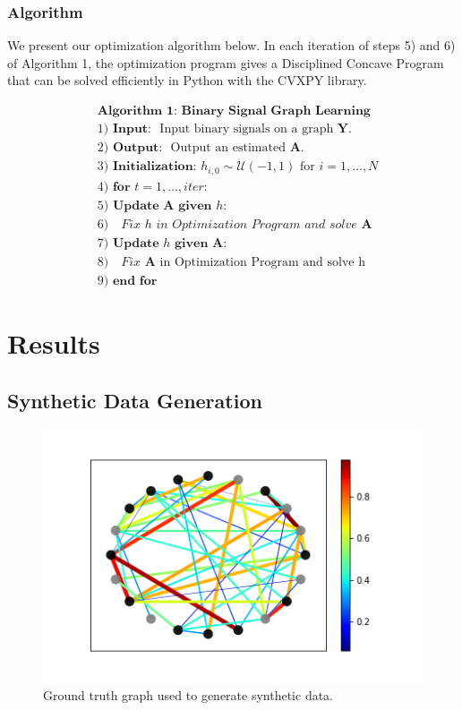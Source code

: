\documentclass[journal]{IEEEtran}
\theoremstyle{definition}
\theoremstyle{remark}
\begin{document}
\subsubsection{Algorithm}

We present our optimization algorithm below. In each iteration of steps 5) and 6) of Algorithm 1, the optimization program gives a Disciplined Concave Program that can be solved efficiently in Python with the CVXPY library.

\begin{align*}
&\textbf{Algorithm 1: Binary Signal Graph Learning} \\
&1) \textbf{ Input: } \text{ Input binary signals on a graph } \mathbf{Y}.\\
&2) \textbf{ Output: } \text{ Output an estimated } \mathbf{A}.\\
&3) \textbf{ Initialization: } h_{i,0} \sim \mathcal{U}(-1,1) \text{ for } i = 1,\ldots, N \\
&4) \textbf{ for } t = 1, \ldots, iter:\\
&5) \textbf{ Update } \mathbf{A} \textbf{ given } h:\\
&6) \,\,\,\, \textit{ Fix }  h \textit{ in Optimization Program and solve } \mathbf{A} \\
&7) \textbf{        Update } h \textbf{ given } \mathbf{A}:\\
&8) \,\,\,\, \textit{ Fix } \mathbf{A} \text{ in Optimization Program and solve h} \\
&9) \textbf{ end for }
\end{align*}

\section{Results}

\subsection{Synthetic Data Generation}

\begin{figure}
  \includegraphics[width=\linewidth]{pictures/gt_graph.png}
  \caption{Ground truth graph used to generate synthetic data.}
  \label{fig:gt}
\end{figure}
\end{document}
